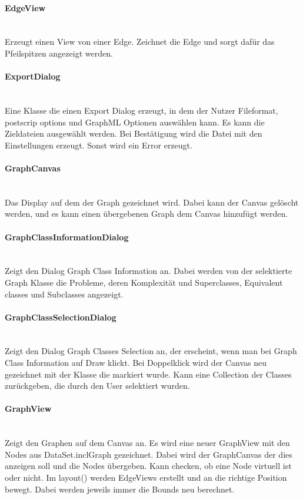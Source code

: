 \documentclass[10pt,a4paper]{article}
\begin{document}
\paragraph{EdgeView}\ \\Erzeugt einen View von einer Edge. Zeichnet die Edge und sorgt dafür das Pfeilspitzen angezeigt werden.

\paragraph{ExportDialog}\ \\Eine Klasse die einen Export Dialog erzeugt, in dem der Nutzer Fileformat, postscrip options und GraphML Optionen auswählen kann. Es kann die Zieldateien ausgewählt werden. Bei Bestätigung wird die Datei mit den Einstellungen erzeugt. Sonst wird ein Error erzeugt.

\paragraph{GraphCanvas}\ \\Das Display auf dem der Graph gezeichnet wird. Dabei kann der Canvas gelöscht werden, und es kann einen übergebenen Graph dem Canvas hinzufügt werden.

\paragraph{GraphClassInformationDialog}\ \\Zeigt den Dialog Graph Class Information an. Dabei werden von der selektierte Graph Klasse die Probleme, deren Komplexität und Superclasses, Equivalent classes und Subclasses angezeigt.

\paragraph{GraphClassSelectionDialog}\ \\Zeigt den Dialog Graph Classes Selection an, der erscheint, wenn man bei Graph Class Information auf Draw klickt. Bei Doppelklick wird der Canvas neu gezeichnet mit der Klasse die markiert wurde. Kann eine Collection der Classes zurückgeben, die durch den User selektiert wurden. 

\paragraph{GraphView}\ \\Zeigt den Graphen auf dem Canvas an. Es wird eine neuer GraphView mit den Nodes aus DataSet.inclGraph gezeichnet. Dabei wird der GraphCanvas der dies anzeigen soll und die Nodes übergeben. Kann checken, ob eine Node virtuell ist oder nicht. Im layout() werden EdgeViews erstellt und an die richtige Position bewegt. Dabei werden jeweils immer die Bounds neu berechnet.
\end{document}
